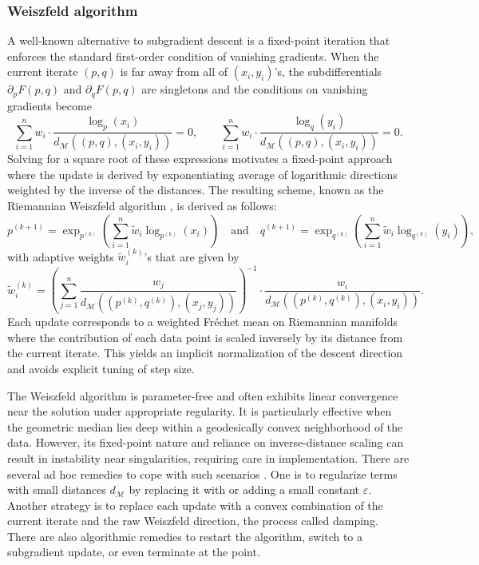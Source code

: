 \documentclass[10pt]{article}
\newcommand{\calM}{\mathcal{M}}
\newcommand{\Frechet}{Fr\'{e}chet\xspace}
\begin{document}
\subsubsection{Weiszfeld algorithm}




A well-known alternative to subgradient descent is a fixed-point iteration that enforces the standard first-order condition of vanishing gradients. When the current iterate $(p,q)$ is far away from all of $(x_i, y_i)$'s, the subdifferentials $\partial_p F(p,q)$ and $\partial_q F(p,q)$ are singletons and the conditions on vanishing gradients become
\begin{equation*}
\sum_{i=1}^n w_i \cdot \frac{\log_p (x_i)}{d_\calM((p,q), (x_i, y_i))} = 0, \qquad \sum_{i=1}^n w_i \cdot \frac{\log_q (y_i)}{d_\calM((p,q), (x_i, y_i))} = 0.
\end{equation*}
Solving for a square root of these expressions motivates a fixed-point approach where the update is derived by exponentiating average of logarithmic directions weighted by the inverse of the distances. The resulting scheme, known as the Riemannian Weiszfeld algorithm \citep{fletcher_2009_GeometricMedianRiemannian}, is derived as follows:
\begin{equation*}
p^{(k+1)} = \exp_{p^{(k)}}\left(\sum_{i=1}^n \tilde{w}_i \log_{p^{(k)}}(x_i)\right)
\quad\text{and}\quad 
q^{(k+1)} = \exp_{q^{(k)}}\left(\sum_{i=1}^n \tilde{w}_i \log_{q^{(k)}}(y_i)\right),
\end{equation*}
with adaptive weights $\tilde{w}_i^{(k)}$'s that are given by 
\begin{equation*}
\tilde{w}_i^{(k)} = \left(\sum_{j=1}^n 
\frac{w_j}{d_\calM((p^{(k)}, q^{(k)}), (x_j, y_j))}
\right)^{-1}\cdot \frac{w_i}{d_\calM((p^{(k)}, q^{(k)}), (x_i, y_i))}.
\end{equation*}
Each update corresponds to a weighted \Frechet mean on Riemannian manifolds where the contribution of each data point is scaled inversely by its distance from the current iterate. This yields an implicit normalization of the descent direction and avoids explicit tuning of step size.

The Weiszfeld algorithm is parameter-free and often exhibits linear convergence near the solution under appropriate regularity. It is particularly effective when the geometric median lies deep within a geodesically convex neighborhood of the data. However, its fixed-point nature and reliance on inverse-distance scaling can result in instability near singularities, requiring care in implementation. There are several ad hoc remedies to cope with such scenarios \cite{beck_2015_WeiszfeldsMethodOld}. One is to regularize terms with small distances $d_\calM$ by replacing it with or adding a small constant $\varepsilon$. Another strategy is to replace each update with a convex combination of the current iterate and the raw Weiszfeld direction, the process called damping. There are also algorithmic remedies to restart the algorithm, switch to a subgradient update, or even terminate at the point. 
\end{document}
